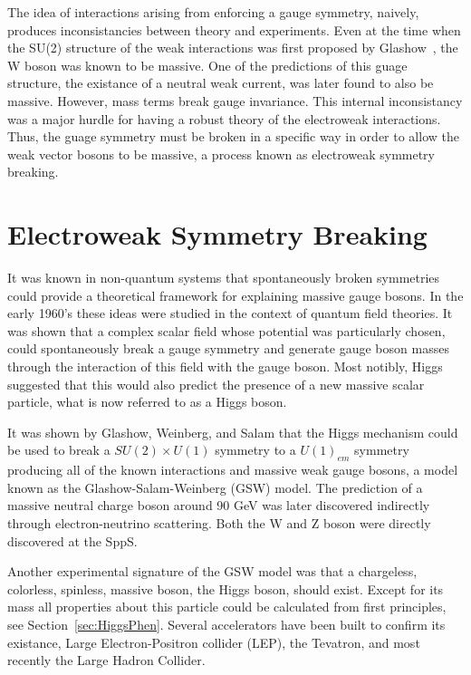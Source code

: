 The idea of interactions arising from enforcing a gauge symmetry, 
naively,
produces inconsistancies between theory and experiments.  Even at 
the time when the SU(2) structure of the weak interactions was first
proposed by Glashow~\cite{??}, the W boson was known to be 
massive.  One of the predictions of this guage structure, the 
existance of a neutral weak current, was later found to also 
be massive.  However, mass terms break gauge
invariance.  This internal inconsistancy was a major hurdle for 
having a robust theory of the electroweak interactions.  Thus, 
the guage symmetry must be broken in a specific way in order
to allow the weak vector bosons to be massive, a process known
as electroweak symmetry breaking.  

\section{Electroweak Symmetry Breaking}
\label{sec:Electroweak Symmetry Breaking}

It was known in non-quantum systems that spontaneously broken symmetries
could provide a theoretical framework for explaining massive gauge 
bosons\cite{}. In the early 1960's these ideas were studied in the context
of quantum field theories.  It was shown that a complex scalar field 
whose potential was particularly chosen, could spontaneously 
break a gauge symmetry and generate gauge boson masses through the 
interaction of this field with the gauge boson\cite{}.  Most notibly, 
Higgs suggested that this would also predict the presence of a new 
massive scalar particle\cite{}, what is now referred to as a Higgs boson.

It was shown by Glashow, Weinberg, and Salam that the Higgs mechanism 
could be used to break a $SU(2)\times U(1)$ symmetry to a $U(1)_{em}$
symmetry producing all of the known interactions and massive weak gauge 
bosons, a model known as the Glashow-Salam-Weinberg (GSW) model.
The prediction of a massive neutral charge boson around 90 GeV 
was later discovered indirectly through electron-neutrino scattering.  
Both the W and Z boson were directly discovered at the SppS.

Another experimental signature of the GSW model was that a chargeless,
colorless, spinless, massive boson, the Higgs boson, should exist.  
Except for its mass all properties about this particle could be calculated
from first principles, see Section~\ref{sec:HiggsPhen}.  Several 
accelerators have been built to confirm its existance, Large 
Electron-Positron collider (LEP), the Tevatron, and most recently the 
Large Hadron Collider.  

